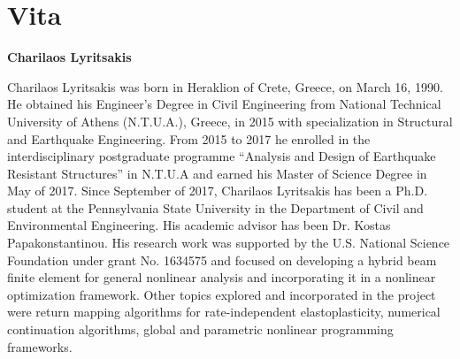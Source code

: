 \chapter*{Vita}
\thispagestyle{empty}
\begin{center}
	\textbf{\large Charilaos Lyritsakis}
\end{center}
Charilaos Lyritsakis was born in Heraklion of Crete, Greece, on March 16, 1990. 
He obtained his Engineer's Degree in Civil Engineering from National Technical 
University of Athens (N.T.U.A.), Greece, in 2015 with specialization in 
Structural and Earthquake Engineering. From 2015 to 2017 he enrolled in the 
interdisciplinary postgraduate programme ``Analysis and Design of Earthquake 
Resistant Structures'' in N.T.U.A and earned his Master of Science Degree in 
May 
of 2017. Since September of 2017, Charilaos Lyritsakis has been a Ph.D. student 
at the Pennsylvania State University in the Department of Civil and 
Environmental Engineering. His academic advisor has been Dr. Kostas 
Papakonstantinou. His research work was supported by the U.S. National Science 
Foundation under grant No. 1634575 and focused on developing a hybrid beam 
finite element for general nonlinear analysis and incorporating it in a 
nonlinear optimization framework. Other topics explored and incorporated in the 
project were return mapping algorithms 
for rate-independent elastoplasticity, numerical continuation algorithms, 
global and parametric nonlinear programming frameworks.